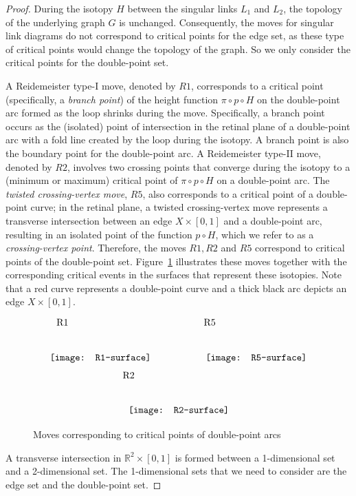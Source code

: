 \documentclass{amsart}\usepackage{amsfonts, amsmath, amssymb}\usepackage{graphicx, epic, epsf, enumerate, stmaryrd}
\theoremstyle{definition}
\numberwithin{equation}{section}
\begin{document}
\begin{proof}
During the isotopy $H$ between the singular links $L_1$ and $L_2$, the topology of the underlying graph $G$ is unchanged. Consequently, the moves for singular link diagrams do not correspond to critical points for the edge set, as these type of critical points would change the topology of the graph. So we only consider the critical points for the double-point set.

A Reidemeister type-I move, denoted by $R1$, corresponds to a critical point (specifically, a \textit{branch point}) of the height function $\pi \circ p \circ H$ on the double-point arc formed as the loop shrinks during the move. Specifically, a branch point occurs as the (isolated) point of intersection in the retinal plane of a double-point arc with a fold line created by the loop during the isotopy. A branch point is also the boundary point for the double-point arc.  A Reidemeister type-II move, denoted by $R2$, involves two crossing points that converge during the isotopy to a (minimum or maximum) critical point of $\pi \circ p \circ H$ on a double-point arc. The \textit{twisted crossing-vertex move}, $R5$, also corresponds to a critical point of a double-point curve; in the retinal plane, a twisted crossing-vertex move represents a transverse intersection between an edge $X \times [0,1]$ and a double-point arc, resulting in an isolated point of the function $p \circ H$, which we refer to as a \textit{crossing-vertex point}.
Therefore, the moves $R1, R2$ and $R5$ correspond to critical points of the double-point set. Figure~\ref{fig:critical-points} illustrates these moves together with the corresponding critical events in the surfaces that represent these isotopies. Note that a red curve represents a double-point curve and a thick black arc depicts an edge $X \times [0,1]$.
\begin{figure}[ht]
\[ \raisebox{5pt}{\texttt{[image: R1-surface]}} \hspace{2cm} \raisebox{5pt}{\texttt{[image: R5-surface]}}
 \put(-260, 41){\fontsize{6}{6}R1}
 \put(-107, 41){\fontsize{6}{6}R5}\]
\[ \raisebox{5pt}{\texttt{[image: R2-surface]}}
 \put(-111, 41){\fontsize{6}{6}R2}\]
 \caption{Moves corresponding to critical points of double-point arcs} \label{fig:critical-points}
\end{figure}

A transverse intersection in $\mathbb{R}^2 \times[0,1]$ is formed between a 1-dimensional set and a 2-dimensional set. The 1-dimensional sets that we need to consider are the edge set and the double-point set.


\end{proof}
\end{document}
